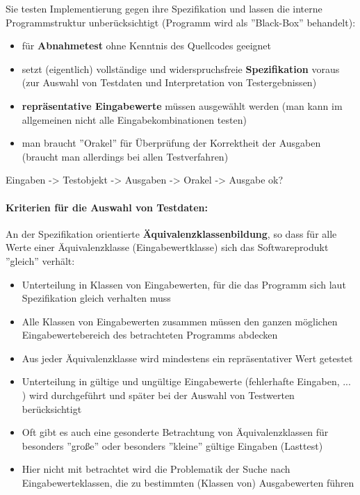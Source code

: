 Sie testen Implementierung gegen ihre Spezifikation und lassen die interne Programmstruktur unberücksichtigt (Programm wird als ''Black-Box'' behandelt):
\begin{itemize}
	\item für \textbf{Abnahmetest} ohne Kenntnis des Quellcodes geeignet
	\item setzt (eigentlich) vollständige und widerspruchsfreie \textbf{Spezifikation} voraus (zur Auswahl von Testdaten und Interpretation von Testergebnissen)
	\item \textbf{repräsentative Eingabewerte} müssen ausgewählt werden (man kann im allgemeinen nicht alle Eingabekombinationen testen)
	\item man braucht ''Orakel'' für Überprüfung der Korrektheit der Ausgaben (braucht man allerdings bei allen Testverfahren)
\end{itemize}

Eingaben -> Testobjekt -> Ausgaben -> Orakel -> Ausgabe ok?

\paragraph{Kriterien für die Auswahl von Testdaten:}

An der Spezifikation orientierte \textbf{Äquivalenzklassenbildung}, so dass für alle Werte einer Äquivalenzklasse (Eingabewertklasse) sich das Softwareprodukt ''gleich'' verhält:
\begin{itemize}
	\item Unterteilung in Klassen von Eingabewerten, für die das Programm sich laut Spezifikation gleich verhalten muss
	\item Alle Klassen von Eingabewerten zusammen müssen den ganzen möglichen Eingabewertebereich des betrachteten Programms abdecken
	\item Aus jeder Äquivalenzklasse wird mindestens ein repräsentativer Wert getestet
	\item Unterteilung in gültige und ungültige Eingabewerte (fehlerhafte Eingaben, ... ) wird durchgeführt und später bei der Auswahl von Testwerten berücksichtigt
	\item Oft gibt es auch eine gesonderte Betrachtung von Äquivalenzklassen für besonders ''große'' oder besonders ''kleine'' gültige Eingaben (Lasttest)
	\item Hier nicht mit betrachtet wird die Problematik der Suche nach Eingabewerteklassen, die zu bestimmten (Klassen von) Ausgabewerten führen 
\end{itemize}

